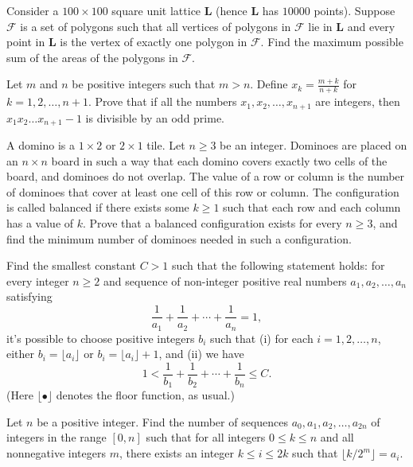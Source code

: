 \documentclass[11pt]{scrartcl}
\begin{document}
\begin{problem}[275429739915708]
Consider a $100\times 100$ square unit lattice $\textbf{L}$ (hence $\textbf{L}$ has $10000$ points). Suppose $\mathcal{F}$ is a set of polygons such that all vertices of polygons in $\mathcal{F}$ lie in $\textbf{L}$ and every point in $\textbf{L}$ is the vertex of exactly one polygon in $\mathcal{F}.$ Find the maximum possible sum of the areas of the polygons in $\mathcal{F}.$
\end{problem}
\begin{problem}[596300332016249]
	Let $m$ and $n$ be positive integers such that $m>n$. Define $x_k=\frac{m+k}{n+k}$ for $k=1,2,\ldots,n+1$. Prove that if all the numbers $x_1,x_2,\ldots,x_{n+1}$ are integers, then $x_1x_2\ldots x_{n+1}-1$ is divisible by an odd prime.
\end{problem}
\begin{problem}[232495612059721]
	A domino is a $ 1 \times 2 $ or $ 2 \times 1 $ tile.
Let $n \ge 3 $ be an integer. Dominoes are placed on an $n \times n$ board in such a way that each domino covers exactly two cells of the board, and dominoes do not overlap. The value of a row or column is the number of dominoes that cover at least one cell of this row or column. The configuration is called balanced if there exists some $k \ge 1 $ such that each row and each column has a value of $k$. Prove that a balanced configuration exists for every $n \ge 3 $, and find the minimum number of dominoes needed in such a configuration.
\end{problem}
\begin{problem}[7229423492681245326]
Find the smallest constant $C > 1$ such that the following statement holds: for every integer $n \geq 2$ and sequence of non-integer positive real numbers $a_1, a_2, \dots, a_n$ satisfying$$\frac{1}{a_1} + \frac{1}{a_2} + \cdots + \frac{1}{a_n} = 1,$$it's possible to choose positive integers $b_i$ such that
(i) for each $i = 1, 2, \dots, n$, either $b_i = \lfloor a_i \rfloor$ or $b_i = \lfloor a_i \rfloor + 1$, and
(ii) we have$$1 < \frac{1}{b_1} + \frac{1}{b_2} + \cdots + \frac{1}{b_n} \leq C.$$(Here $\lfloor \bullet \rfloor$ denotes the floor function, as usual.)
\end{problem}
\begin{problem}[758429597657132]
Let $n$ be a positive integer. Find the number of sequences $a_0,a_1,a_2,\dots,a_{2n}$ of integers in the range $[0,n]$ such that for all integers $0\leq k\leq n$ and all nonnegative integers $m$, there exists an integer $k\leq i\leq 2k$ such that $\lfloor k/2^m\rfloor=a_i.$
\end{problem}
\end{document}
